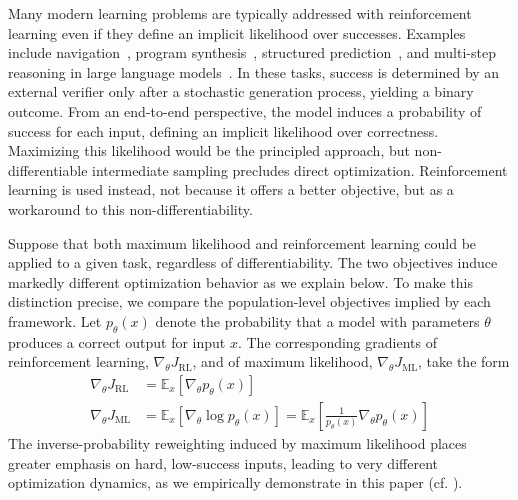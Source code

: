 \documentclass[10pt]{article} %
\begin{document}
Many modern learning problems are typically addressed with reinforcement learning even if they define an implicit likelihood over successes.
Examples include navigation~\citep{probabilistic_robotics,anderson2018visionandlanguagenavigationinterpretingvisuallygrounded}, program synthesis~\citep{chen2018synthesizingcomplexprogramsinputoutput,bunel2018leveraginggrammarreinforcementlearning}, structured prediction~\citep{linguistic_structure_prediction,mensch2018differentiabledynamicprogrammingstructured}, and multi-step reasoning in large language models~\citep{wei2023chainofthoughtpromptingelicitsreasoning}.
In these tasks, success is determined by an external verifier only after a stochastic generation process, yielding a binary outcome. From an end-to-end perspective, the model induces a probability of success for each input, defining an implicit likelihood over correctness. Maximizing this likelihood would be the principled approach, but non-differentiable intermediate sampling precludes direct optimization. Reinforcement learning is used instead, not because it offers a better objective, but as a workaround to this non-differentiability.




Suppose that both maximum likelihood and reinforcement learning could be applied to a given task, regardless of differentiability. The two objectives induce markedly different optimization behavior as we explain below.
To make this distinction precise, we compare the population-level objectives implied by each framework. Let \(p_\theta(x)\) denote the probability that a model with parameters \(\theta\) produces a correct output for input \(x\). The corresponding gradients of reinforcement learning, $\nabla_\theta J_{\mathrm{RL}}$, and of maximum likelihood, $\nabla_\theta J_{\mathrm{ML}}$, take the form
\begin{align*}
    \nabla_\theta J_{\mathrm{RL}}
    &= \mathbb{E}_x\!\left[\nabla_\theta p_\theta(x)\right] \\
    \nabla_\theta J_{\mathrm{ML}}
    &= \mathbb{E}_x\!\left[\nabla_\theta \log p_\theta(x)\right]
     = \mathbb{E}_x\!\left[\frac{1}{p_\theta(x)} \nabla_\theta p_\theta(x)\right]
\end{align*}
The inverse-probability reweighting induced by maximum likelihood places greater emphasis on hard, low-success inputs, leading to very different optimization dynamics, as we empirically demonstrate in this paper (cf. ).
\end{document}
